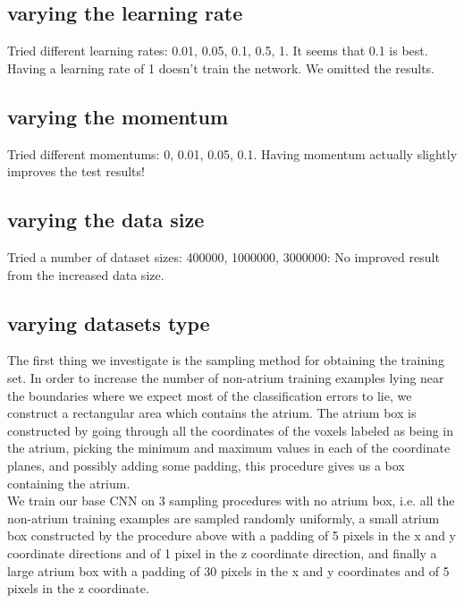 \subsection{varying the learning rate}

\noindent Tried different learning rates: 0.01, 0.05, 0.1, 0.5, 1. It seems that 0.1 is best. Having a learning rate of 1 doesn't train the network.  We omitted the results.



\subsection{varying the momentum}

\noindent Tried different momentums: 0, 0.01, 0.05, 0.1. Having momentum actually slightly improves the test results!



\subsection{varying the data size}

\noindent Tried a number of dataset sizes: 400000, 1000000, 3000000: No improved result from the increased data size.

\subsection{varying datasets type}

\noindent The first thing we investigate is the sampling method for obtaining the training set. In order to increase the number of non-atrium training examples lying near the boundaries where we expect most of the classification errors to lie, we construct a rectangular area which contains the atrium. The atrium box is constructed by going through all the coordinates of the voxels labeled as being in the atrium, picking the minimum and maximum values in each of the coordinate planes, and possibly adding some padding, this procedure gives us a box containing the atrium. \\

\noindent We train our base CNN on 3 sampling procedures with no atrium box, i.e. all the non-atrium training examples are sampled randomly uniformly, a small atrium box constructed by the procedure above with a padding of 5 pixels in the x and y coordinate directions and of 1 pixel in the z coordinate direction, and finally a large atrium box with a padding of 30 pixels in the x and y coordinates and of 5 pixels in the z coordinate.\\


